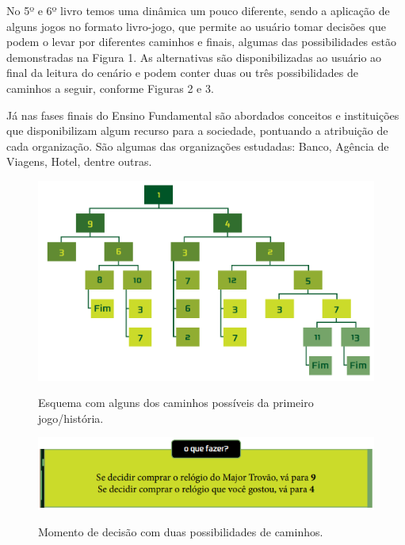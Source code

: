             No 5º e 6º livro temos uma dinâmica um pouco diferente, sendo a aplicação de alguns jogos no formato livro-jogo, que permite ao usuário tomar decisões que podem o levar por diferentes caminhos e finais, algumas das possibilidades estão demonstradas na Figura 1. As alternativas são disponibilizadas ao usuário ao final da leitura do cenário e podem conter duas ou três possibilidades de caminhos a seguir, conforme Figuras 2 e 3.

            Já nas fases finais do Ensino Fundamental são abordados conceitos e instituições que disponibilizam algum recurso para a sociedade, pontuando a atribuição de cada organização. São algumas das organizações estudadas: Banco, Agência de Viagens, Hotel, dentre outras.

            \begin{figure}[h]
                \centering
                \caption{Esquema com alguns dos caminhos possíveis da primeiro jogo/história.}
                \includegraphics[scale=0.3]{Textuais/Pictures/Picture1.png}
                \label{fig:figure-1}
            \end{figure}
            \begin{figure}[h]
                \centering
                \caption{Momento de decisão com duas possibilidades de caminhos.}
                \includegraphics[scale=1]{Textuais/Pictures/Picture2.png}
                \label{fig:figure-2}
            \end{figure}
